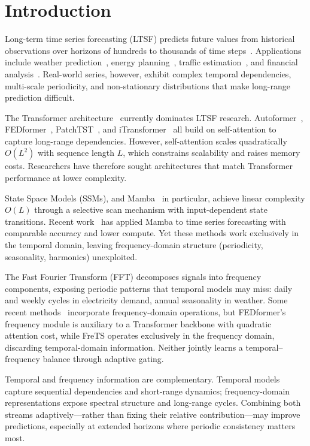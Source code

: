 \documentclass[electronics,article,submit,pdftex,moreauthors]{Definitions/mdpi}
\begin{document}
\section{Introduction}

Long-term time series forecasting (LTSF) predicts future values from historical observations over horizons of hundreds to thousands of time steps~\cite{ref1,ref2}. Applications include weather prediction~\cite{ref1}, energy planning~\cite{ref2}, traffic estimation~\cite{ref3}, and financial analysis~\cite{ref4}. Real-world series, however, exhibit complex temporal dependencies, multi-scale periodicity, and non-stationary distributions that make long-range prediction difficult.

The Transformer architecture~\cite{ref5} currently dominates LTSF research. Autoformer~\cite{ref6}, FEDformer~\cite{ref7}, PatchTST~\cite{ref8}, and iTransformer~\cite{ref9} all build on self-attention to capture long-range dependencies. However, self-attention scales quadratically $O(L^2)$ with sequence length $L$, which constrains scalability and raises memory costs. Researchers have therefore sought architectures that match Transformer performance at lower complexity.

State Space Models (SSMs), and Mamba~\cite{ref10} in particular, achieve linear complexity $O(L)$ through a selective scan mechanism with input-dependent state transitions. Recent work~\cite{ref11,ref12} has applied Mamba to time series forecasting with comparable accuracy and lower compute. Yet these methods work exclusively in the temporal domain, leaving frequency-domain structure (periodicity, seasonality, harmonics) unexploited.

The Fast Fourier Transform (FFT) decomposes signals into frequency components, exposing periodic patterns that temporal models may miss: daily and weekly cycles in electricity demand, annual seasonality in weather. Some recent methods~\cite{ref7,ref16} incorporate frequency-domain operations, but FEDformer's frequency module is auxiliary to a Transformer backbone with quadratic attention cost, while FreTS operates exclusively in the frequency domain, discarding temporal-domain information. Neither jointly learns a temporal--frequency balance through adaptive gating.

Temporal and frequency information are complementary. Temporal models capture sequential dependencies and short-range dynamics; frequency-domain representations expose spectral structure and long-range cycles. Combining both streams adaptively---rather than fixing their relative contribution---may improve predictions, especially at extended horizons where periodic consistency matters most.
\end{document}
